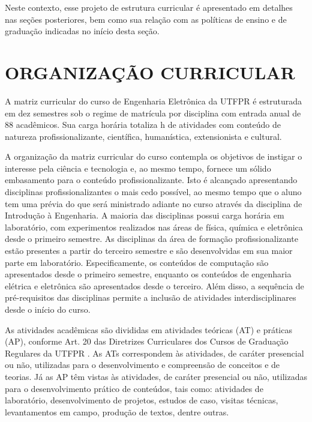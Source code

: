Neste contexto, esse projeto de estrutura curricular é apresentado em detalhes nas seções posteriores, bem como sua relação com as políticas de ensino e de graduação indicadas no início desta seção.


\section{ORGANIZAÇÃO CURRICULAR}

A matriz curricular do curso de Engenharia Eletrônica da UTFPR é estruturada em dez semestres sob o regime de matrícula por disciplina com entrada anual de 88 acadêmicos.{ }Sua carga horária totaliza \the\value{horasT} h de atividades com conteúdo de natureza profissionalizante, científica, humanística, extensionista e cultural.

A organização da matriz curricular do curso contempla os objetivos de instigar o interesse pela ciência e tecnologia e, ao mesmo tempo, fornece um sólido embasamento para o conteúdo profissionalizante. Isto é alcançado apresentando disciplinas profissionalizantes o mais cedo possível, ao mesmo tempo que o aluno tem uma prévia do que será ministrado adiante no curso através da disciplina de Introdução à Engenharia. A maioria das disciplinas possui carga horária em laboratório, com experimentos realizados nas áreas de física, química e eletrônica desde o primeiro semestre. As disciplinas da área de formação profissionalizante estão presentes a partir do terceiro semestre e são desenvolvidas em sua maior parte em laboratório. Especificamente, os conteúdos de computação são apresentados desde o primeiro semestre, enquanto os conteúdos de engenharia elétrica e eletrônica são apresentados desde o terceiro. Além disso, a sequência de pré-requisitos das disciplinas permite a inclusão de atividades interdisciplinares desde o início do curso.


As atividades acadêmicas são divididas em atividades teóricas (AT) e práticas (AP), conforme Art. 20 das Diretrizes Curriculares dos Cursos de Graduação Regulares da UTFPR \cite{cogep142}. As ATs correspondem às atividades, de caráter presencial ou não, utilizadas para o desenvolvimento e compreensão de conceitos e de teorias. Já as AP têm vistas às atividades, de caráter presencial ou não, utilizadas para o desenvolvimento prático de conteúdos, tais como: atividades de laboratório, desenvolvimento de projetos, estudos de caso, visitas técnicas, levantamentos em campo, produção de textos, dentre outras.

